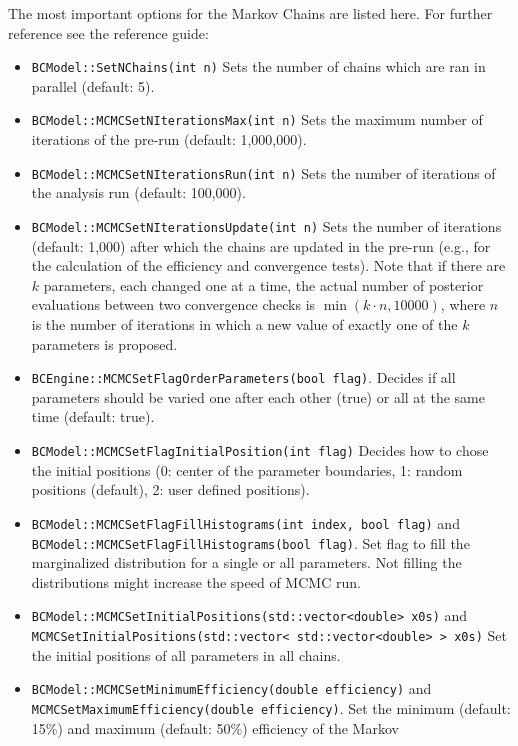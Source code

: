 \documentclass[11pt, a4paper]{article}
\begin{document}
The most important options for the Markov Chains are listed here. For
further reference see the reference guide:
%
\begin{itemize}
\item \verb|BCModel::SetNChains(int n)| Sets the number of chains
  which are ran in parallel (default: 5).
\item \verb|BCModel::MCMCSetNIterationsMax(int n)| Sets the maximum
  number of iterations of the pre-run (default: 1,000,000).
\item \verb|BCModel::MCMCSetNIterationsRun(int n)| Sets the number of
  iterations of the analysis run (default: 100,000).
\item \verb|BCModel::MCMCSetNIterationsUpdate(int n)| Sets the number
  of iterations (default: 1,000) after which the chains are updated in
  the pre-run (e.g., for the calculation of the efficiency and
  convergence tests). Note that if there are $k$ parameters, each changed one 
  at a time, the actual number of posterior evaluations between 
  two convergence checks is $\min \left(k \cdot n, 10000\right)$, where $n$ is the number of iterations in
  which a new value of exactly one of the $k$ parameters is proposed.
\item \verb|BCEngine::MCMCSetFlagOrderParameters(bool flag)|. Decides
  if all parameters should be varied one after each other (true) or
  all at the same time (default: true).
\item \verb|BCModel::MCMCSetFlagInitialPosition(int flag)| Decides how
  to chose the initial positions (0: center of the parameter
  boundaries, 1: random positions (default), 2: user defined
  positions).
\item \verb|BCModel::MCMCSetFlagFillHistograms(int index, bool flag)| and \\
  \verb|BCModel::MCMCSetFlagFillHistograms(bool flag)|. Set flag to fill the marginalized distribution for a single or all parameters. Not filling the distributions might increase the speed of MCMC run.
\item \verb|BCModel::MCMCSetInitialPositions(std::vector<double> x0s)|
  and \\
  \verb|MCMCSetInitialPositions(std::vector< std::vector<double> > x0s)|
  Set the initial positions of all parameters in all chains.
\item \verb|BCModel::MCMCSetMinimumEfficiency(double efficiency)| and \\
  \verb|MCMCSetMaximumEfficiency(double efficiency)|. Set the minimum
  (default: 15\%) and maximum (default: 50\%) efficiency of the Markov

\end{itemize}
\end{document}
